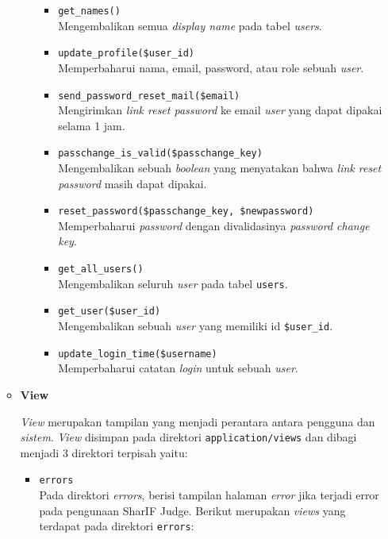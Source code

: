 \documentclass[a4paper,twoside]{article}
\begin{document}
\begin{enumerate}
\begin{itemize}
\begin{itemize}
\begin{itemize}
				                  \item \verb|get_names()| \\
				                        Mengembalikan semua \textit{display name} pada tabel \textit{users}.
				                  \item \verb|update_profile($user_id)| \\
				                        Memperbaharui nama, email, password, atau role sebuah \textit{user}.
				                  \item \verb|send_password_reset_mail($email)| \\
				                        Mengirimkan \textit{link reset password} ke email \textit{user} yang dapat dipakai selama 1 jam.
				                  \item \verb|passchange_is_valid($passchange_key)| \\
				                        Mengembalikan sebuah \textit{boolean} yang menyatakan bahwa \textit{link reset password} masih dapat dipakai.
				                  \item \verb|reset_password($passchange_key, $newpassword)| \\
				                        Memperbaharui \textit{password} dengan divalidasinya \textit{password change key}.
				                  \item \verb|get_all_users()| \\
				                        Mengembalikan seluruh \textit{user} pada tabel \verb|users|.
				                  \item \verb|get_user($user_id)| \\
				                        Mengembalikan sebuah \textit{user} yang memiliki id \verb|$user_id|.
				                  \item \verb|update_login_time($username)| \\
				                        Memperbaharui catatan \textit{login} untuk sebuah \textit{user}.
			                  \end{itemize}
		            \end{itemize}

		      \item \textbf{View}
		            \label{sub:3:1:1:view}

		            \textit{View} merupakan tampilan yang menjadi perantara antara pengguna dan \textit{sistem}. \textit{View} disimpan pada direktori \verb|application/views| dan dibagi menjadi 3 direktori terpisah yaitu:

		            \begin{itemize}
			            \item \verb|errors| \\
			                  Pada direktori \textit{errors}, berisi tampilan halaman \textit{error} jika terjadi error pada pengunaan SharIF Judge. Berikut merupakan \textit{views} yang terdapat pada direktori \verb|errors|:


\end{itemize}
\end{itemize}
\end{enumerate}
\end{document}
